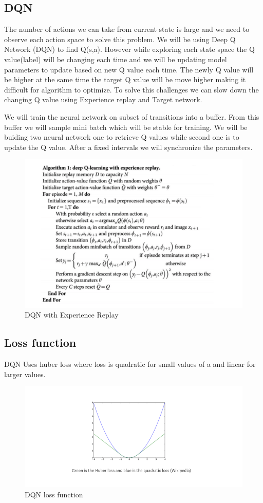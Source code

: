 \subsection{DQN}
The number of actions we can take from current state is large and we need to observe each action space to solve this problem. We will be using Deep Q Network (DQN) to find Q(s,a). However while exploring each state space the Q value(label) will be changing each time and we will be updating model parameters to update based on new Q value each time. The newly Q value will be higher at the same time the target Q value will be move higher making it difficult for algorithm to optimize. To solve this challenges we can slow down the changing Q value using Experience replay and Target network.

We will train the neural network on subset of transitions into a buffer. From this buffer we will sample mini batch which will be stable for training. We will be buiding two neural network one to retrieve Q values while second one is to update the Q value. After a fixed intervals we will synchronize the parameters. 

\begin{figure}%
\centering
\includegraphics[width=0.6\columnwidth]{figures/DQN-ExperinceReplay.png}%
\caption{DQN with Experience Replay}%
\label{fig:datastats}%
\end{figure}


\subsection{Loss function}


DQN Uses huber loss where loss is quadratic for small values of a and linear for larger values.


\begin{figure}%
\centering
\includegraphics[width=0.6\columnwidth]{figures/loss-function.png}%
\caption{DQN loss function}%
\label{fig:datastats}%
\end{figure}


